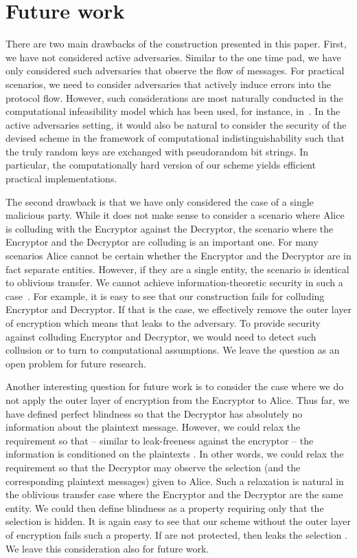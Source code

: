 \documentclass[10pt,journal]{IEEEtran}
\begin{document}
\section{Future work}
\label{sec:Future work}

There are two main drawbacks of the construction presented in this paper.
First, we have not considered active adversaries. Similar to the one time pad, we have only considered
such adversaries that observe the flow of messages. For practical scenarios, we need to consider
adversaries that actively induce errors into the protocol flow. However, such considerations
are most naturally conducted in the computational infeasibility model which has been used, for instance, in~\cite{Green_2011}.
In the active adversaries setting, it would also be
natural to consider the security of the devised scheme in the framework of computational indistinguishability such that
the truly random keys are exchanged with pseudorandom bit strings. In particular, the computationally hard version of
our scheme yields efficient practical implementations.

The second drawback is that we have only considered the case of a single malicious party. While it does not make
sense to consider a scenario where Alice is colluding with the Encryptor against the Decryptor,
the scenario where the Encryptor and the Decryptor are colluding is an important one. For many scenarios Alice cannot be certain
whether the Encryptor and the Decryptor are in fact separate entities.
However, if they are a single entity, the scenario is identical to oblivious transfer.
We cannot achieve information-theoretic security in such a case~\cite{Damgard_1999}.
For example,
it is easy to see that our construction fails for colluding Encryptor and Decryptor.
If that is the case, we effectively remove the outer layer of encryption which means
that  leaks  to the adversary.
To provide security against
colluding Encryptor and Decryptor, we would need to detect such collusion or to turn to computational
assumptions. We leave the question as an open problem for future research. 

Another interesting question for future work is to consider the case where we do not apply the outer layer
of encryption from the Encryptor to Alice. Thus far, we have defined perfect blindness so that the Decryptor has absolutely no information about
the plaintext message.
However, we could relax the requirement so that -- similar to leak-freeness against the encryptor --
the information is conditioned on the plaintexts . In other words, we could relax the requirement so
that the Decryptor may observe the selection (and the corresponding plaintext messages) given to Alice.
Such a relaxation
is natural in the oblivious transfer case where the Encryptor and the Decryptor are the same entity.
We could then define blindness as a property
requiring only that the selection  is hidden. It is again easy to see that our scheme without the outer layer
of encryption fails such a property. If  are not protected, then  leaks the selection .
We leave this consideration also for future work.
\end{document}
